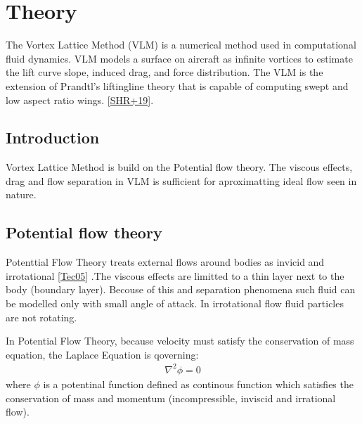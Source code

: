 \documentclass[letterpaper,10pt,english]{jupyterBook}
\begin{document}
\sphinxstepscope


\chapter{Theory}
\label{\detokenize{chapters/description/theory:theory}}\label{\detokenize{chapters/description/theory::doc}}
\sphinxAtStartPar
The Vortex Lattice Method (VLM) is a numerical method used in computational fluid dynamics. VLM models a surface on aircraft as infinite vortices to estimate the lift curve slope, induced drag, and force distribution. The VLM is the extension of Prandtl’s lifting\sphinxhyphen{}line theory that is capable of computing swept and low aspect ratio wings. {[}\hyperlink{cite.chapters/bibliography:id10}{SHR+19}{]}.


\section{Introduction}
\label{\detokenize{chapters/description/theory:introduction}}
\sphinxAtStartPar
Vortex Lattice Method is build on the Potential flow theory. The viscous effects, drag and flow separation in VLM is sufficient for aproximatting ideal flow seen in nature.


\section{Potential flow theory}
\label{\detokenize{chapters/description/theory:potential-flow-theory}}
\sphinxAtStartPar
Potenttial Flow Theory treats external flows around bodies as invicid and irrotational {[}\hyperlink{cite.chapters/bibliography:id6}{Tec05}{]} .The viscous effects are limitted to a thin layer next to the body (boundary layer). Becouse of this and separation phenomena such fluid can be modelled only with small angle of attack. In irrotational flow fluid particles are not rotating.

\sphinxAtStartPar
In Potential Flow Theory, because velocity must satisfy the conservation of mass equation, the Laplace Equation is qoverning:
\begin{equation*}
\begin{split}
\nabla^{2} \phi = 0
\end{split}
\end{equation*}
\sphinxAtStartPar
where \(\phi\) is a potentinal function defined as continous function which satisfies the conservation of mass and momentum (incompressible, inviscid and irrational flow).
\end{document}

